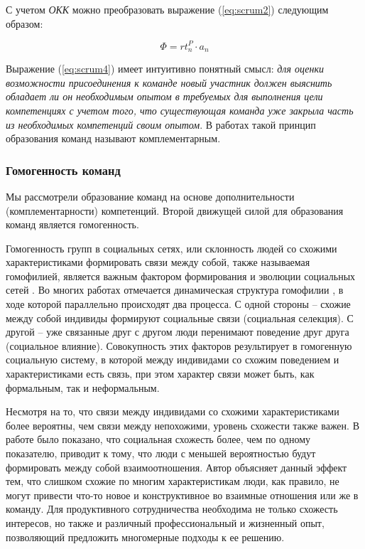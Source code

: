 С учетом \emph{ОКК} можно преобразовать выражение (\ref{eq:scrum2}) следующим образом:

\begin{equation} 
\label{eq:scrum4}
\Phi  =  rt_n^P \cdot a_n 
\end{equation}

Выражение (\ref{eq:scrum4}) имеет интуитивно понятный смысл: 
\emph{для оценки возможности присоединения к команде новый участник должен выяснить обладает ли он необходимым опытом в требуемых для выполнения цели компетенциях с учетом того, что существующая команда уже закрыла часть из необходимых компетенций своим опытом}. 
В работах \cite{hamilton2003team,prat2002should} такой принцип образования команд называют комплементарным.

\subsubsection{Гомогенность команд}

Мы рассмотрели образование команд на основе дополнительности (комплементарности) компетенций. 
Второй движущей силой для образования команд является гомогенность.

Гомогенность групп в социальных сетях, или склонность людей со схожими характеристиками формировать связи между собой, также называемая гомофилией, является важным фактором формирования и эволюции социальных сетей \cite{mcpherson2001birds}. 
Во многих работах отмечается динамическая структура гомофилии \cite{snijders2010introduction,steglich20108}, в ходе которой параллельно происходят два процесса.
С одной стороны -- схожие между собой индивиды формируют социальные связи (социальная селекция). 
С другой -- уже связанные друг с другом люди перенимают поведение друг друга (социальное влияние).
Совокупность этих факторов результирует в гомогенную социальную систему, в которой между индивидами со схожим поведением и характеристиками есть связь, при этом характер связи может быть, как формальным, так и неформальным.

Несмотря на то, что связи между индивидами со схожими характеристиками более вероятны, чем связи между непохожими, уровень схожести также важен.
В работе \cite{block2014multidimensional} было показано, что социальная схожесть более, чем по одному показателю, приводит к тому, что люди с меньшей вероятностью будут формировать между собой взаимоотношения. 
Автор объясняет данный эффект тем, что слишком схожие по многим характеристикам люди, как правило, не могут привести что-то новое и конструктивное во взаимные отношения или же в команду.
Для продуктивного сотрудничества необходима не только схожесть интересов, но также и различный профессиональный и жизненный опыт, позволяющий предложить многомерные подходы к ее решению.


